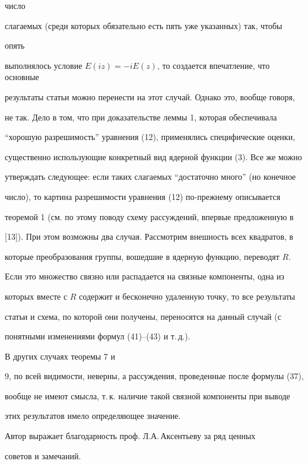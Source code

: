 число 


слагаемых (среди которых обязательно есть пять уже указанных) так, чтобы 


опять 


выполнялось условие $E(iz)=-iE(z)$, то создается впечатление, что основные 


результаты статьи можно перенести на этот случай. Однако это, вообще говоря, 


не так. Дело в том, что при доказательстве леммы 1, которая обеспечивала 


``хорошую разрешимость'' уравнения (12), применялись специфические оценки, 


существенно использующие конкретный вид ядерной функции (3). Все же можно 


утверждать следующее: если таких слагаемых ``достаточно много'' (но конечное 


число), то картина разрешимости уравнения (12) по-прежнему описывается 


теоремой 1 (см. по этому поводу схему рассуждений, впервые предложенную в 


[13]). При этом возможны два случая. Рассмотрим внешность всех квадратов, в 


которые преобразования группы, вошедшие в ядерную функцию, переводят $R$. 


Если это множество связно или распадается на связные компоненты, одна из 


которых вместе с $R$ содержит и бесконечно удаленную точку, то все результаты 


статьи и схема, по которой они получены, переносятся на данный случай (с 


понятными изменениями формул (41)--(43) и т.\,д.). 


В других случаях теоремы 7 и 


9, по всей видимости, неверны, а рассуждения, проведенные после формулы (37), 


вообще не имеют смысла, т.\,к. наличие такой связной компоненты при выводе 


этих результатов имело определяющее значение. 


 


Автор выражает благодарность проф. Л.А.\,Аксентьеву за ряд ценных 


советов и замечаний. 


 


 


